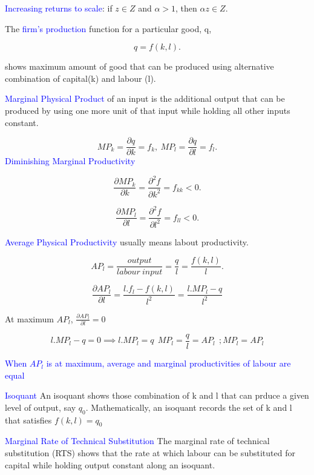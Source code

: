 \documentclass{tufte-handout}
\begin{document}
\textbullet   \textcolor{blue}{Increasing returns to scale}: if $z \in Z$ and  $\alpha > 1$, then  $\alpha z \in Z$.


\fi

\textbullet  The \textcolor{blue}{firm's production} function for a particular good, q,

\[
q =  f(k,l)
.\] 

shows maximum amount of good that can be produced using alternative combination of capital(k) and labour (l).

\textbullet  \textcolor{blue}{Marginal Physical Product} of an input is the additional output that can be produced by using one more unit of that input while holding all other inputs constant.

\[
MP_k = \frac{\partial q}{\partial k} = f_k, \ MP_l = \frac{\partial q}{\partial l} =  f_l

.\] 
\textbullet  \textcolor{blue}{Diminishing Marginal Productivity}

\[
		\frac{\partial MP_k}{\partial k} = \frac{\partial^2 f}{\partial k^2} = f_{kk} < 0 
.\] 

\[
		\frac{\partial MP_l}{\partial l} = \frac{\partial^2 f}{\partial l^2} = f_{ll} < 0 
.\] 


\textbullet  \textcolor{blue}{Average Physical Productivity} usually means labout productivity.


\[
AP_l = \frac{output}{labour \ input} = \frac{q}{l} = \frac{f(k,l)}{l}
.\] 


$$\frac{\partial AP_l}{\partial l} =  \frac{l.f_l - f(k,l)}{l^2} = 
\frac{l.MP_l - q}{l^2}

$$ 

At maximum $AP_l$,  $\frac{\partial AP_l }{\partial l } = 0$



$$ l.MP_l - q = 0 \implies l.MP_l = q \ \ MP_l = \frac{q}{l} = AP_l \ \ ;  MP_l = AP_l $$
		
\textcolor{blue}{When $AP_l$ is at maximum, average and marginal productivities of labour are equal}


\textbullet  \textcolor{blue}{Isoquant} An isoquant shows those combination of k and l that can prduce a given level of output, say $q_0$.
Mathematically, an isoquant records the set of k and l that satisfies  $f(k,l) = q_0$


\clearpage

\textbullet   \textcolor{blue}{Marginal Rate of Technical Substitution} The marginal rate of technical substitution (RTS) shows that the rate at which labour can be substituted for capital while holding output constant along an isoquant.
\end{document}
